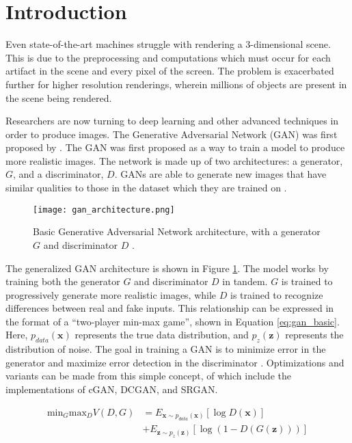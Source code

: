 \documentclass{article}
\begin{document}
\section{Introduction}
\label{sec:introduction}
Even state-of-the-art machines struggle with rendering a 3-dimensional scene. This is due to the preprocessing and computations which must occur for each artifact in the scene and every pixel of the screen. The problem is exacerbated further for higher resolution renderings, wherein millions of objects are present in the scene being rendered.

Researchers are now turning to deep learning and other advanced techniques in order to produce images. The Generative Adversarial Network (GAN) was first
proposed by \cite{gan}.
The GAN was first proposed as a way to train a model to produce
more realistic images. The network is made up of two architectures:
a generator, $G$, and a discriminator, $D$.
GANs are able to generate new images that have similar qualities to
those in the dataset which they are trained on
\cite{generative_adversarial_networks}.

\begin{figure}[htbp]
\centerline{\texttt{[image: gan\_architecture.png]}}
\caption{Basic Generative Adversarial Network architecture, with a generator $G$
and discriminator $D$
\cite{cgan}.}
\label{fig:gan_architecture}
\end{figure}

The generalized GAN architecture is shown in Figure \ref{fig:gan_architecture}.
The model works by training both the generator $G$ and
discriminator $D$ in tandem.
$G$ is trained to progressively generate more realistic images,
while $D$ is trained to recognize differences between real and fake inputs.
This relationship can be expressed in the format of a
``two-player min-max game'', shown in Equation \ref{eq:gan_basic}.
Here, $p_{data}(\mathbf{x})$ represents the true data distribution,
and $p_{z}(\mathbf{z})$ represents the distribution of noise.
The goal in training a GAN is to minimize error in the generator
and maximize error detection in the discriminator \cite{cgan}.
Optimizations and variants can be made from this simple concept, of which include
the implementations of cGAN, DCGAN, and SRGAN.

\begin{equation}
\label{eq:gan_basic}
\begin{split}
\text{min}_G\text{max}_DV(D,G) &=
E_{\mathbf{x}\sim p_{data}(\mathbf{x})}[\log D(\mathbf{x})] \\
&+ E_{\mathbf{z}\sim p_{z}(\mathbf{z})}[\log(1 - D(G(\mathbf{z})))]
\end{split}
\end{equation}
\end{document}
